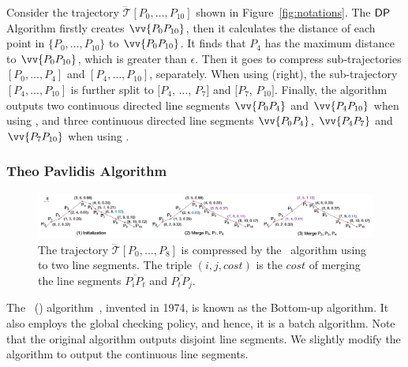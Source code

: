 \begin{example}
\label{exm-alg-lsa}
Consider the trajectory $\dddot{\mathcal{T}}[P_0,\ldots,P_{10}]$ shown in Figure~\ref{fig:notations}.
The ${\mathsf{DP}}$ Algorithm firstly creates $\vv{P_0P_{10}}$, then it calculates the distance of each point in $\{P_0,\ldots,P_{10}\}$ to $\vv{P_0P_{10}}$.
It finds that $P_{4}$ has the maximum distance to $\vv{P_0P_{10}}$, which is greater than $\epsilon$. Then it goes to compress sub-trajectories $[P_0, \ldots, P_{4}]$ and $[P_{4}, \ldots, P_{10}]$, separately.
When using \sed (right), the sub-trajectory $[P_4,\ldots, P_{10}]$ is further split to $[P_4$, $\ldots$, $P_7]$ and $[P_7$, $P_{10}]$.
Finally, the algorithm outputs two continuous directed line segments $\vv{P_0P_4}$ and $\vv{P_4P_{10}}$ when using \ped, and three continuous directed line segments $\vv{P_0P_4}$, $\vv{P_4P_7}$ and $\vv{P_7P_{10}}$ when using \sed.
\end{example}



\subsubsection{Theo Pavlidis Algorithm}

\begin{figure}[tb!]
\centering
\includegraphics[scale=0.55]{figures/Fig-Pavlidis.png}
\vspace{-3ex}
\caption{\small The trajectory $\dddot{\mathcal{T}}[P_0, \ldots, P_{8}]$ is compressed by the \pavlidis~algorithm using \ped to two line segments. The triple $(i, j, cost)$ is the $cost$ of merging the line segments $\overline{P_iP_t}$ and $\overline{P_tP_j}$.} %
\vspace{-2ex}
\label{fig:pavlidis}
\end{figure}

The {\pavlidis~(\tpa) algorithm}~\cite{Pavlidis:Segment}, invented in 1974, is known as the Bottom-up algorithm. It also employs the global checking policy, and hence, it is a batch algorithm. Note that the original \tpa algorithm outputs disjoint line segments. We slightly modify the algorithm to output the continuous line segments.

